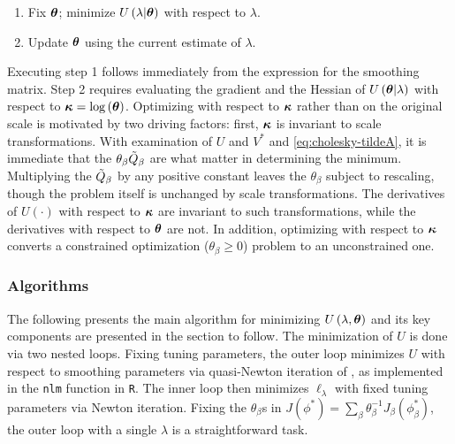 \documentclass[../chapter-2-spline-representation.tex]{subfiles}
\begin{document}
\begin{enumerate}
\item Fix $\mbox{\boldmath $\theta$}$; minimize $U\left(\lambda \vert \mbox{\boldmath $\theta$}\right)$ with respect to $\lambda$.
\item Update $\mbox{\boldmath $\theta$}$ using the current estimate of $\lambda$.
\end{enumerate}
\noindent
Executing step 1 follows immediately from the expression for the smoothing matrix. Step 2 requires evaluating the gradient and the Hessian of $U\left( \mbox{\boldmath $\theta$} \vert \lambda \right)$ with respect to $\mbox{\boldmath $\kappa$} = \log\left(\mbox{\boldmath $\theta$}\right)$. Optimizing with respect to $\mbox{\boldmath $\kappa$}$ rather than on the original scale is motivated by two driving factors: first, $\mbox{\boldmath $\kappa$}$ is invariant to scale transformations. With examination of $U$ and $V^*$ and \ref{eq:cholesky-tildeA}, it is immediate that the $\theta_\beta \tilde{Q}_\beta$ are what matter in determining the minimum. Multiplying the $\tilde{Q}_\beta$ by any positive constant leaves the $\theta_\beta$ subject to rescaling, though the problem itself is unchanged by scale transformations. The derivatives of $U\left(\cdot\right)$ with respect to $\mbox{\boldmath $\kappa$}$ are invariant to such transformations, while the derivatives with respect to $\mbox{\boldmath $\theta$}$ are not. In addition, optimizing with respect to $\mbox{\boldmath $\kappa$}$ converts a constrained optimization ($\theta_\beta \ge 0$) problem to an unconstrained one.

\subsubsection{Algorithms}

The following presents the main algorithm for minimizing $U\left(\lambda, \mbox{\boldmath $\theta$} \right)$ and its key components are presented in the section to follow. The minimization of $U$ is done via two nested loops. Fixing tuning parameters, the outer loop minimizes $U$ with respect to smoothing parameters via quasi-Newton iteration of \citet{dennis1996numerical}, as implemented in the \texttt{nlm} function in \texttt{R}. The inner loop then minimizes $\ell_\lambda$ with fixed tuning parameters via Newton iteration. Fixing the $\theta_\beta$s in $J \left(\phi^*\right) = \sum_\beta \theta^{-1}_\beta J_\beta \left(\phi_\beta^*\right)$, the outer loop with a single $\lambda$ is a straightforward task. 
\end{document}
